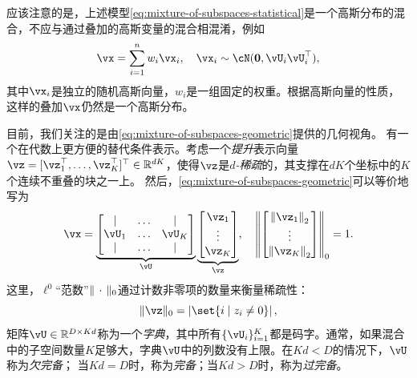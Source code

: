 \documentclass[../../book-main.tex]{subfiles}
\begin{document}
\begin{remark}[高斯混合与高斯叠加]
应该注意的是，上述模型\eqref{eq:mixture-of-subspaces-statistical}是一个高斯分布的混合，不应与通过叠加的高斯变量的混合相混淆，例如
\begin{equation}
    \vx = \sum_{i=1}^n w_i \vx_i, \quad \vx_i \sim \cN(\mathbf{0}, \vU_i\vU_i^\top),
\end{equation}
其中$\vx_i$是独立的随机高斯向量，$w_i$是一组固定的权重。根据高斯向量的性质，这样的叠加$\vx$仍然是一个高斯分布。
\end{remark}

目前，我们关注的是由\eqref{eq:mixture-of-subspaces-geometric}提供的几何视角。
有一个在代数上更方便的替代条件表示。考虑一个\textit{提升}表示向量$\vz = [\vz_1^\top, \dots, \vz_K^\top]^\top \in \R^{dK}$，使得$\vz$是\textit{$d$-稀疏}的，其支撑在$dK$个坐标中的$K$个连续不重叠的块之一上。
然后，\eqref{eq:mixture-of-subspaces-geometric}可以等价地写为
\begin{equation}\label{eq:mixture-of-subspaces-dictionary-pre}
    \vx = 
    \underbrace{
    \begin{bmatrix} 
    | & \hdots & |  \\
    \vU_1 & \hdots & \vU_K  \\
    | & \hdots & | 
    \end{bmatrix} 
    }_{\vU}
    \underbrace{
    \begin{bmatrix} \vz_1 \\ \vdots \\ \vz_K \end{bmatrix}
    }_{\vz},
    \quad
    \norm*{
    \begin{bmatrix} \norm*{\vz_1}_2 \\ \vdots \\ \norm*{\vz_K}_2 \end{bmatrix}
    }_0 = 1.
\end{equation}
这里，$\ell^0$“范数”$\norm{\,\cdot\,}_0$通过计数非零项的数量来衡量稀疏性：
\begin{equation}\label{eq:ell-zero-norm}
    \norm{\vz}_0 = \abs*{\set{i \given z_i \neq 0}},
\end{equation}
矩阵$\vU \in \R^{D \times Kd}$称为一个\textit{字典}，其中所有$\{\vU_i\}_{i=1}^K$都是码字。通常，如果混合中的子空间数量$K$足够大，字典$\vU$中的列数没有上限。在$Kd < D$的情况下，$\vU$称为\textit{欠完备}；
当$Kd = D$时，称为\textit{完备}；当$Kd > D$时，称为\textit{过完备}。
\end{document}
